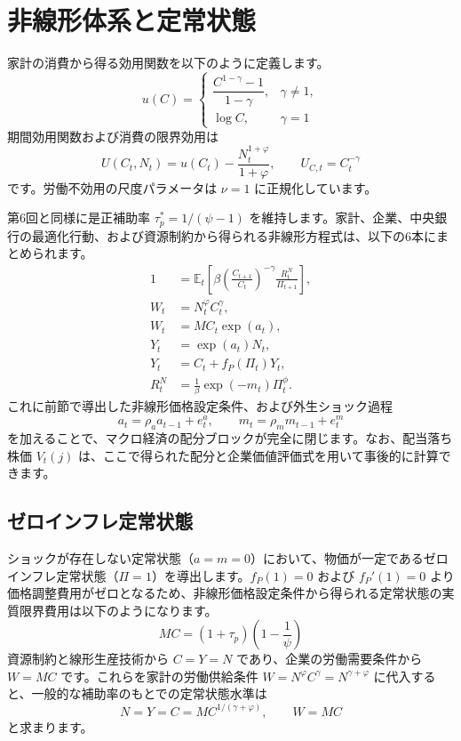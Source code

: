 \documentclass[
  japanese,
  lualatex,
  ja=standard,
  12pt,
  a4paper]{ltjsarticle}
\begin{document}
\section{非線形体系と定常状態}\label{ux975eux7ddaux5f62ux4f53ux7cfbux3068ux5b9aux5e38ux72b6ux614b}

家計の消費から得る効用関数を以下のように定義します。 \[
u(C)=
\begin{cases}
\dfrac{C^{1-\gamma}-1}{1-\gamma},&\gamma\neq1,\\[6pt]
\log C,&\gamma=1
\end{cases}
\] 期間効用関数および消費の限界効用は \[
U(C_t,N_t)=u(C_t)-\frac{N_t^{1+\varphi}}{1+\varphi},
\qquad
U_{C,t}=C_t^{-\gamma}
\] です。労働不効用の尺度パラメータは \(\nu=1\) に正規化しています。

第6回と同様に是正補助率 \(\tau_p^*=1/(\psi-1)\)
を維持します。家計、企業、中央銀行の最適化行動、および資源制約から得られる非線形方程式は、以下の6本にまとめられます。
\[
\begin{aligned}
1&=\mathbb{E}_t\left[
\beta\left(\frac{C_{t+1}}{C_t}\right)^{-\gamma}
\frac{R_t^N}{\Pi_{t+1}}
\right],\\
W_t&=N_t^\varphi C_t^\gamma,\\
W_t&=MC_t\exp(a_t),\\
Y_t&=\exp(a_t)N_t,\\
Y_t&=C_t+f_P(\Pi_t)Y_t,\\
R_t^N&=\frac{1}{\beta}\exp(-m_t)\Pi_t^\phi.
\end{aligned}
\] これに前節で導出した非線形価格設定条件、および外生ショック過程 \[
a_t=\rho_a a_{t-1}+e_t^a,
\qquad
m_t=\rho_m m_{t-1}+e_t^m
\]
を加えることで、マクロ経済の配分ブロックが完全に閉じます。なお、配当落ち株価
\(V_t(j)\)
は、ここで得られた配分と企業価値評価式を用いて事後的に計算できます。

\subsection{ゼロインフレ定常状態}\label{ux30bcux30edux30a4ux30f3ux30d5ux30ecux5b9aux5e38ux72b6ux614b}

ショックが存在しない定常状態（\(a=m=0\)）において、物価が一定であるゼロインフレ定常状態（\(\Pi=1\)）を導出します。\(f_P(1)=0\)
および \(f_P'(1)=0\)
より価格調整費用がゼロとなるため、非線形価格設定条件から得られる定常状態の実質限界費用は以下のようになります。
\[
MC
=(1+\tau_p)\left(1-\frac{1}{\psi}\right)
\] 資源制約と線形生産技術から \(C=Y=N\) であり、企業の労働需要条件から
\(W=MC\) です。これらを家計の労働供給条件
\(W=N^\varphi C^\gamma = N^{\gamma+\varphi}\)
に代入すると、一般的な補助率のもとでの定常状態水準は \[
N=Y=C
=MC^{1/(\gamma+\varphi)},
\qquad
W=MC
\] と求まります。
\end{document}
